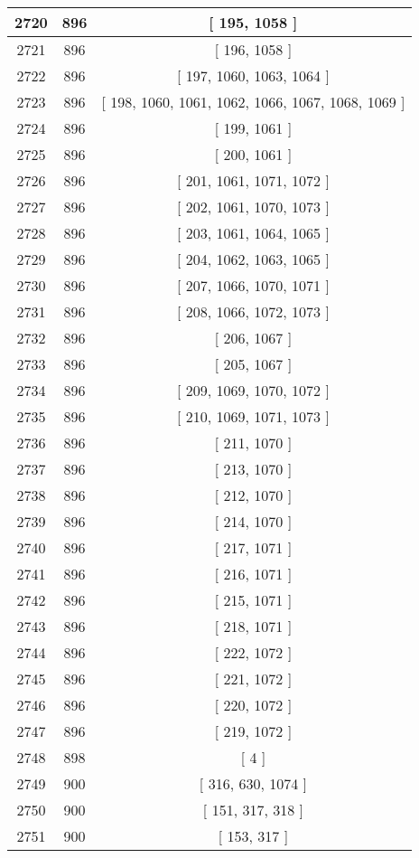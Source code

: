 \begin{center}
\begin{longtable}[H]{|| c c c ||}
\hline
2720 & 896 & [ 195, 1058 ] \\ 
\hline
2721 & 896 & [ 196, 1058 ] \\ 
\hline
2722 & 896 & [ 197, 1060, 1063, 1064 ] \\ 
\hline
2723 & 896 & [ 198, 1060, 1061, 1062, 1066, 1067, 1068, 1069 ] \\ 
\hline
2724 & 896 & [ 199, 1061 ] \\ 
\hline
2725 & 896 & [ 200, 1061 ] \\ 
\hline
2726 & 896 & [ 201, 1061, 1071, 1072 ] \\ 
\hline
2727 & 896 & [ 202, 1061, 1070, 1073 ] \\ 
\hline
2728 & 896 & [ 203, 1061, 1064, 1065 ] \\ 
\hline
2729 & 896 & [ 204, 1062, 1063, 1065 ] \\ 
\hline
2730 & 896 & [ 207, 1066, 1070, 1071 ] \\ 
\hline
2731 & 896 & [ 208, 1066, 1072, 1073 ] \\ 
\hline
2732 & 896 & [ 206, 1067 ] \\ 
\hline
2733 & 896 & [ 205, 1067 ] \\ 
\hline
2734 & 896 & [ 209, 1069, 1070, 1072 ] \\ 
\hline
2735 & 896 & [ 210, 1069, 1071, 1073 ] \\ 
\hline
2736 & 896 & [ 211, 1070 ] \\ 
\hline
2737 & 896 & [ 213, 1070 ] \\ 
\hline
2738 & 896 & [ 212, 1070 ] \\ 
\hline
2739 & 896 & [ 214, 1070 ] \\ 
\hline
2740 & 896 & [ 217, 1071 ] \\ 
\hline
2741 & 896 & [ 216, 1071 ] \\ 
\hline
2742 & 896 & [ 215, 1071 ] \\ 
\hline
2743 & 896 & [ 218, 1071 ] \\ 
\hline
2744 & 896 & [ 222, 1072 ] \\ 
\hline
2745 & 896 & [ 221, 1072 ] \\ 
\hline
2746 & 896 & [ 220, 1072 ] \\ 
\hline
2747 & 896 & [ 219, 1072 ] \\ 
\hline
2748 & 898 & [ 4 ] \\ 
\hline
2749 & 900 & [ 316, 630, 1074 ] \\ 
\hline
2750 & 900 & [ 151, 317, 318 ] \\ 
\hline
2751 & 900 & [ 153, 317 ] \\ 

\end{longtable}
\end{center}

